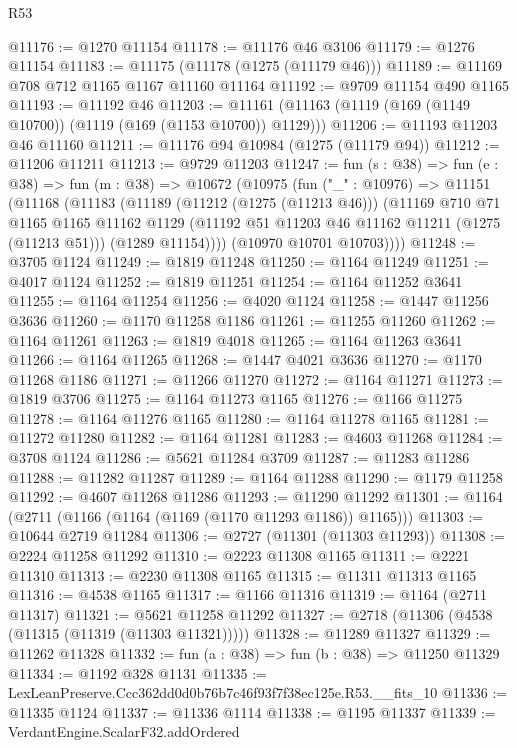 \begin{lexlean}{R53}
\begin{coremodule}
@11176 := @1270 @11154
@11178 := @11176 @46 @3106
@11179 := @1276 @11154
@11183 := @11175 (@11178 (@1275 (@11179 @46)))
@11189 := @11169 @708 @712 @1165 @1167 @11160 @11164
@11192 := @9709 @11154 @490 @1165
@11193 := @11192 @46
@11203 := @11161 (@11163 (@1119 (@169 (@1149 @10700)) (@1119 (@169 (@1153 @10700)) @1129)))
@11206 := @11193 @11203 @46 @11160
@11211 := @11176 @94 @10984 (@1275 (@11179 @94))
@11212 := @11206 @11211
@11213 := @9729 @11203
@11247 := fun (s : @38) =>
  fun (e : @38) =>
  fun (m : @38) =>
  @10672
    (@10975
      (fun ("_" : @10976) =>
      @11151
        (@11168
          (@11183
            (@11189
              (@11212 (@1275 (@11213 @46)))
              (@11169
                @710
                @71
                @1165
                @1165
                @11162
                @1129
                (@11192 @51 @11203 @46 @11162 @11211 (@1275 (@11213 @51)))
                (@1289 @11154))))
          (@10970 @10701 @10703))))
@11248 := @3705 @1124
@11249 := @1819 @11248
@11250 := @1164 @11249
@11251 := @4017 @1124
@11252 := @1819 @11251
@11254 := @1164 @11252 @3641
@11255 := @1164 @11254
@11256 := @4020 @1124
@11258 := @1447 @11256 @3636
@11260 := @1170 @11258 @1186
@11261 := @11255 @11260
@11262 := @1164 @11261
@11263 := @1819 @4018
@11265 := @1164 @11263 @3641
@11266 := @1164 @11265
@11268 := @1447 @4021 @3636
@11270 := @1170 @11268 @1186
@11271 := @11266 @11270
@11272 := @1164 @11271
@11273 := @1819 @3706
@11275 := @1164 @11273 @1165
@11276 := @1166 @11275
@11278 := @1164 @11276 @1165
@11280 := @1164 @11278 @1165
@11281 := @11272 @11280
@11282 := @1164 @11281
@11283 := @4603 @11268
@11284 := @3708 @1124
@11286 := @5621 @11284 @3709
@11287 := @11283 @11286
@11288 := @11282 @11287
@11289 := @1164 @11288
@11290 := @1179 @11258
@11292 := @4607 @11268 @11286
@11293 := @11290 @11292
@11301 := @1164 (@2711 (@1166 (@1164 (@1169 (@1170 @11293 @1186)) @1165)))
@11303 := @10644 @2719 @11284
@11306 := @2727 (@11301 (@11303 @11293))
@11308 := @2224 @11258 @11292
@11310 := @2223 @11308 @1165
@11311 := @2221 @11310
@11313 := @2230 @11308 @1165
@11315 := @11311 @11313 @1165
@11316 := @4538 @1165
@11317 := @1166 @11316
@11319 := @1164 (@2711 @11317)
@11321 := @5621 @11258 @11292
@11327 := @2718 (@11306 (@4538 (@11315 (@11319 (@11303 @11321)))))
@11328 := @11289 @11327
@11329 := @11262 @11328
@11332 := fun (a : @38) => fun (b : @38) => @11250 @11329
@11334 := @1192 @328 @1131
@11335 := LexLeanPreserve.Ccc362dd0d0b76b7c46f93f7f38ec125e.R53.__fits_10
@11336 := @11335 @1124
@11337 := @11336 @1114
@11338 := @1195 @11337
@11339 := VerdantEngine.ScalarF32.addOrdered

\end{coremodule}
\end{lexlean}

